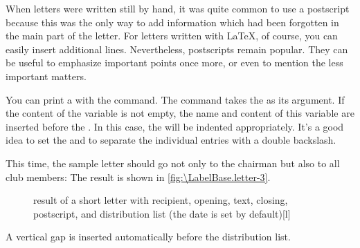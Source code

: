 \begin{Explain}
  When letters were written still by hand, it was quite common to use a
  postscript because this was the only way to add information which had been
  forgotten in the main part of the letter. For letters written with \LaTeX{},
  of course, you can easily insert additional lines. Nevertheless, postscripts
  remain popular. They can be useful to emphasize important points once more,
  or even to mention the less important matters.
\end{Explain}
%
\EndIndexGroup


\begin{Declaration}
\end{Declaration}
You can print a %
 with the  command. The
command takes the  as its argument. If the content of
the variable  is not
empty, the name and content of this variable are inserted before the
. In this case, the  will be
indented appropriately. It's a good idea to set the
  and to
separate the individual entries with a double backslash.
\begin{Example}
  This time, the sample letter should go not only to the chairman but also to
  all club members:
  The result is shown in \autoref{fig:\LabelBase.letter-3}.
  \begin{figure}
    \setcapindent{0pt}%
    \begin{captionbeside}{%
        result of a short letter with recipient, opening, text, closing,
        postscript, and distribution list (the date is set by default)}[l]
    \end{captionbeside}
    \label{fig:\LabelBase.letter-3}
  \end{figure}
\end{Example}
A vertical gap is inserted automatically before the distribution list.%
%
\EndIndexGroup


